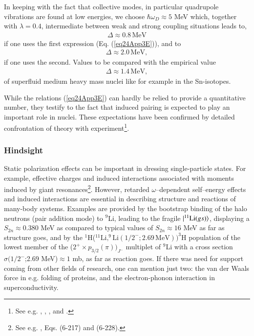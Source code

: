 In keeping with the fact that collective modes, in particular quadrupole vibrations are found at low energies, we choose $\hbar\omega_D\approx5$ MeV which, together with  $\lambda=0.4$, intermediate between weak and strong coupling situations leads to,
\begin{align}
\Delta\approx 0.8\,\text{MeV}
\end{align}
if one uses the first expression (Eq. (\ref{eq24App3E})), and to
\begin{align}
\Delta\approx2.0\,\text{MeV},
\end{align}
if one uses the second. Values to be compared with the empirical value
\begin{align}
\Delta\approx1.4\,\text{MeV},
\end{align}
of superfluid medium heavy mass nuclei like for example in the Sn-isotopes.

While the relations (\ref{eq24App3E}) can hardly be relied to provide a quantitative number, they testify to the fact that induced pairing is expected to play an important role in nuclei. These expectations have been confirmed by detailed confrontation of theory with experiment\footnote{See e.g. \cite{Barranco:99}, \cite{Terasaki:02b}, \cite{Barranco:05}, and \cite{Idini:15}.}.
\subsubsection{Hindsight}
Static polarization effects can be important in dressing single-particle states. For example, effective charges  and induced interactions associated with moments induced by giant resonances\footnote{See e.g. \cite{Bohr:75}, Eqs. (6-217) and (6-228).}. However, retarded $\omega$--dependent self--energy effects and induced interactions are essential in describing structure and reactions of many-body systems. Examples are provided by the bootstrap binding of the halo neutrons (pair addition mode) to $^9$Li, leading to the fragile $|{^{11}\text{Li}(gs)} \rangle$, displaying a $S_{2n}\approx0.380$ MeV as compared to typical values of $S_{2n}\approx16$ MeV as far as structure goes, and by the $^1$H($^{11}\text{Li},^9\text{Li}(1/2^-;2.69\,\text{MeV}))^3$H population of the lowest member of the ($2^+\times p_{3/2}(\pi))_{J^-}$ multiplet of $^9$Li with a cross section $\sigma(1/2^-$;2.69 MeV)$\approx 1$ mb, as far as reaction goes.
If there was need for support coming from other fields of research, one can mention just two: the van der Waals force in e.g. folding of proteins, and the electron-phonon interaction in superconductivity.



